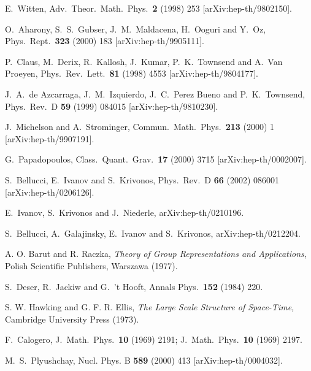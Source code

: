 \documentclass[a4paper,12pt]{article}
\begin{document}
\begin{thebibliography}{99}
E.~Witten,
Adv.\ Theor.\ Math.\ Phys.\  {\bf 2} (1998) 253
[arXiv:hep-th/9802150].


O.~Aharony, S.~S.~Gubser, J.~M.~Maldacena, H.~Ooguri and
Y.~Oz,
Phys.\ Rept.\  {\bf 323} (2000) 183
[arXiv:hep-th/9905111].


P.~Claus, M.~Derix, R.~Kallosh, J.~Kumar, P.~K.~Townsend and
A.~Van Proeyen,
Phys.\ Rev.\ Lett.\  {\bf 81} (1998) 4553
[arXiv:hep-th/9804177].


J.~A.~de Azcarraga, J.~M.~Izquierdo, J.~C.~Perez Bueno and
P.~K.~Townsend,
Phys.\ Rev.\ D {\bf 59} (1999) 084015
[arXiv:hep-th/9810230].


J.~Michelson and A.~Strominger,
Commun.\ Math.\ Phys.\  {\bf 213} (2000) 1
[arXiv:hep-th/9907191].


G.~Papadopoulos,
Class.\ Quant.\ Grav.\  {\bf 17} (2000) 3715
[arXiv:hep-th/0002007].


S.~Bellucci, E.~Ivanov and S.~Krivonos,
Phys.\ Rev.\ D {\bf 66} (2002) 086001
[arXiv:hep-th/0206126].

E.~Ivanov, S.~Krivonos and J.~Niederle,
arXiv:hep-th/0210196.


S.~Bellucci, A.~Galajinsky, E.~Ivanov and S.~Krivonos,
arXiv:hep-th/0212204.


A. O. Barut and R. Raczka,
{\it Theory of Group Representations and Applications},
Polish Scientific Publishers, Warszawa (1977).


S.~Deser, R.~Jackiw and G.~'t Hooft,
Annals Phys.\  {\bf 152} (1984) 220.

S. W. Hawking and G. F. R. Ellis,
{\it The Large Scale Structure of Space-Time,}
Cambridge University Press (1973).


F.~Calogero,
J.\ Math.\ Phys.\  {\bf 10} (1969) 2191;
J.\ Math.\ Phys.\  {\bf 10} (1969) 2197.




M.~S.~Plyushchay,
Nucl. Phys. B {\bf 589} (2000) 413
[arXiv:hep-th/0004032].



\end{thebibliography}
\end{document}
